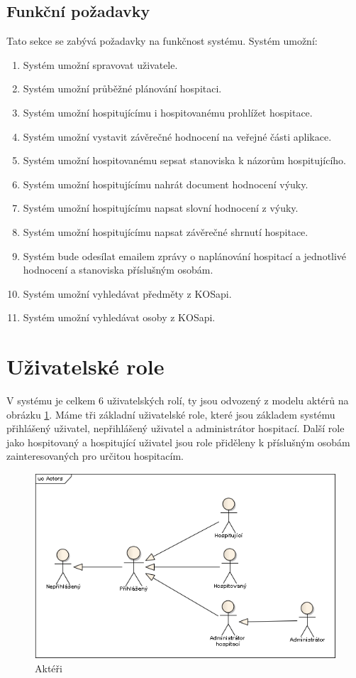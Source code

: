 \subsection{Funkční požadavky}
Tato sekce se zabývá požadavky na funkčnost systému. Systém umožní:
\begin{enumerate}
\item Systém umožní spravovat uživatele.
\item Systém umožní průběžné plánování hospitaci.
\item Systém umožní hospitujícímu i hospitovanému prohlížet hospitace.
\item Systém umožní vystavit závěrečné hodnocení na veřejné části aplikace. 
\item Systém umožní hospitovanému sepsat stanoviska k názorům hospitujícího.
\item Systém umožní hospitujícímu nahrát document hodnocení výuky.
\item Systém umožní hospitujícímu napsat slovní hodnocení z výuky.
\item Systém umožní hospitujícímu napsat závěrečné shrnutí hospitace.
\item Systém bude odesílat emailem zprávy o naplánování hospitací a jednotlivé hodnocení a stanoviska příslušným osobám.
\item Systém umožní vyhledávat předměty z KOSapi.
\item Systém umožní vyhledávat osoby z KOSapi.
\end{enumerate}

\section{Uživatelské role}
V systému je celkem 6 uživatelských rolí, ty jsou odvozený z modelu aktérů na obrázku \ref{fig:actors}. Máme tři základní uživatelské role, které jsou základem systému přihlášený uživatel, nepřihlášený uživatel a administrátor hospitací. Další role jako hospitovaný a hospitující uživatel jsou role přiděleny k příslušným osobám zainteresovaných pro určitou hospitacím.

\begin{figure}[h]
\begin{center}
\includegraphics[width=16cm]{figures/Actors}
\caption{Aktéři}
\label{fig:actors}
\end{center}
\end{figure}

